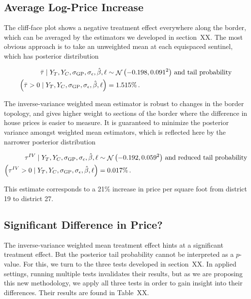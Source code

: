 \documentclass[letter]{article}
\newcommand{\genericdel}[3]{%
      \left#1#3\right#2
    }
\newcommand{\del}[1]{\genericdel(){#1}}
\let\Pr\relax
\DeclareMathOperator{\Pr}{\mathbb{P}}
\DeclareMathOperator{\normal}{\mathcal{N}}
\newcommand{\sigmaf}{\sigma_{\mathrm{GP}}}
\newcommand{\sigman}{\sigma_{\epsilon}}
\newcommand{\linavg}{\bar{\tau}}
\newcommand{\invvar}{\tau^{IV}}
\begin{document}
    	\subsection{Average Log-Price
Increase}\label{average-log-price-increase}

The cliff-face plot shows a negative treatment effect everywhere along
the border, which can be averaged by the estimators we developed in
section~XX. The most obvious approach is to take an unweighted mean at
each equispaced sentinel, which has posterior distribution

\begin{equation}
\begin{split}
    \linavg \mid Y_T, Y_C, \sigmaf, \sigman, \hat{\beta}, \ell &\sim \normal\del{-0.198, 0.091^2}\,\text{and tail probability} \\
    \Pr\del{\linavg > 0 \mid Y_T, Y_C, \sigmaf, \sigman, \hat{\beta}, \ell} &= 1.515\% \,.
\end{split}
\end{equation}

The inverse-variance weighted mean estimator is robust to changes in the
border topology, and gives higher weight to sections of the border where
the difference in house prices is easier to measure. It is guaranteed to
minimize the posterior variance amongst weighted mean estimators, which
is reflected here by the narrower posterior distribution

\begin{equation}
\begin{split}
    \invvar \mid Y_T, Y_C, \sigmaf, \sigman, \hat{\beta}, \ell &\sim \normal\del{-0.192, 0.059^2}\,\text{and reduced tail probability} \\
    \Pr\del{\invvar > 0 \mid Y_T, Y_C, \sigmaf, \sigman, \hat{\beta}, \ell} &= 0.017\% \,.
\end{split}
\end{equation}

This estimate corresponds to a 21\% increase in price per square foot
from district 19 to district 27.
    


    	\subsection{Significant Difference in
Price?}\label{significant-difference-in-price}

The inverse-variance weighted mean treatment effect hints at a
significant treatment effect. But the posterior tail probability cannot
be interpreted as a \(p\)-value. For this, we turn to the three tests
developed in section~XX. In applied settings, running multiple tests
invalidates their results, but as we are proposing this new methodology,
we apply all three tests in order to gain insight into their
differences. Their results are found in Table~XX.
\end{document}
